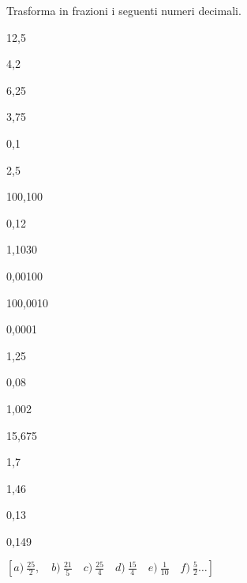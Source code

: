 \begin{esercizio}[\Ast]
\label{ese:3.21}
Trasforma in frazioni i seguenti numeri decimali.
\begin{multicols}{5}
\begin{enumeratea}
 \item 12,5
 \item 4,2
 \item 6,25
 \item 3,75
 \item 0,1
 \item 2,5
 \item 100,100
 \item 0,12
 \item 1,1030
 \item 0,00100
 \item 100,0010
 \item 0,0001
 \item 1,25
 \item 0,08
 \item 1,002
 \item 15,675
 \item 1,7
 \item 1,46
 \item 0,13
 \item 0,149
\end{enumeratea}
\end{multicols}
\(\left[a)~\frac{25}{2},\quad b)~\frac{21}{5}\quad c)~\frac{25}{4}\quad 
d)~\frac{15}{4}\quad e)~\frac{1}{10}\quad f)~\frac{5}{2} \dots \right]\)
\end{esercizio}


\begin{comment}
\begin{esercizio}
 \label{ese:3.22}
Completa la tabella.

 \begin{tabular*}{.9\textwidth}{@{\extracolsep{\fill}}*{6}{lccccc}}
 \toprule
 &\multicolumn{2}{c}{Parte}& & &\\
 Numero decimale & intera & decimale & Periodo & Antiperiodo & Frazione\\
 \midrule
 1,7521& & & & &\\
~\(3,\overline{75}\)& & & & &\\
~\(12,1\overline{24}\)& & & & &\\
~\(1,0\overline{5}~\)& & & & &\\
~\(0,13\overline{57}~\)& & & & &\\
 \bottomrule
 \end{tabular*}
\end{esercizio}

\end{comment}


